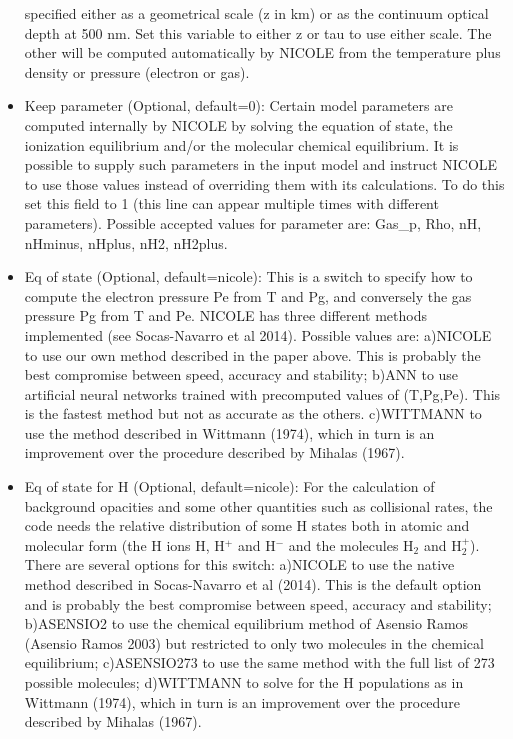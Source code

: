 \begin{itemize}
  specified either as a geometrical scale (z in km) or as the
  continuum optical depth at 500 nm. Set this variable to either z or
  tau to use either scale. The other will be computed automatically by
  NICOLE from the temperature plus density or pressure (electron or
  gas). 
\item Keep {parameter} (Optional, default=0): Certain model parameters
  are computed internally by NICOLE by solving the equation of state,
  the ionization equilibrium and/or the molecular chemical
  equilibrium. It is possible to supply such parameters in the input
  model and instruct NICOLE to use those values instead of overriding
  them with its calculations. To do this set this field to 1 (this
  line can appear multiple times with different parameters). Possible
  accepted values for parameter are: Gas\_p, Rho, nH, nHminus, nHplus,
  nH2, nH2plus.
\item Eq of state (Optional, default=nicole): This is a switch to
  specify how to compute the electron pressure Pe from T and Pg, and
  conversely the gas pressure Pg from T and Pe. NICOLE has three
  different methods implemented (see Socas-Navarro et al
  2014). Possible values are: a)NICOLE to use our own method described
  in the paper above. This is probably the best compromise between
  speed, accuracy and stability; b)ANN to use artificial neural
  networks trained with precomputed values of (T,Pg,Pe). This is the
  fastest method but not as accurate as the others. c)WITTMANN to use
  the method described in Wittmann (1974), which in turn is an
  improvement over the procedure described by Mihalas (1967).
\item Eq of state for H (Optional, default=nicole): For the
  calculation of background opacities and some other quantities such
  as collisional rates, the code needs the relative distribution of
  some H states both in atomic and molecular form (the H ions H, H$^+$
  and H$^-$ and the molecules H$_2$ and H$_2^+$). There are several
  options for this switch: a)NICOLE to use the native method described
  in Socas-Navarro et al (2014). This is the default option and is
  probably the best compromise between speed, accuracy and stability;
  b)ASENSIO2 to use the chemical equilibrium method of Asensio Ramos
  (Asensio Ramos 2003) but restricted to only two molecules in the
  chemical equilibrium; c)ASENSIO273 to use the same method with the
  full list of 273 possible molecules; d)WITTMANN to solve for the H
  populations as in Wittmann (1974), which in turn is an improvement
  over the procedure described by Mihalas (1967).

\end{itemize}
